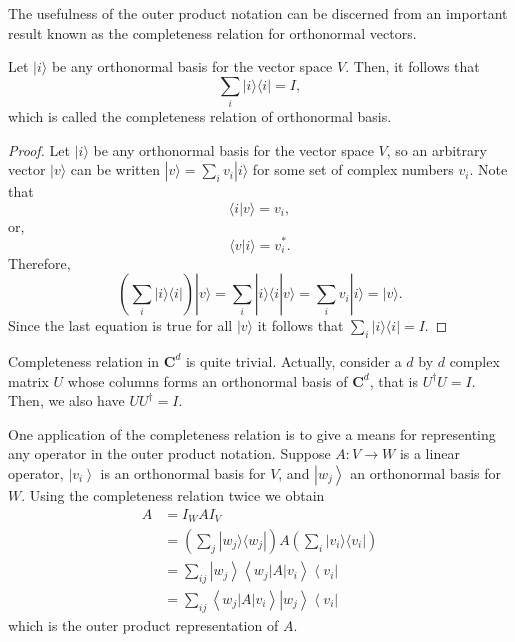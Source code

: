 \documentclass[
	11pt, %
	fleqn, %
	a4paper, %
]{LegrandOrangeBook}
\begin{document}
The usefulness of the outer product notation can be discerned from an important result known as the completeness relation for orthonormal vectors. 

\begin{theorem}
    Let $|i\rangle$ be any orthonormal basis for the vector space $V$. Then, it follows that
$$
\sum_{i}|i\rangle\langle i|=I,
$$
which is called the completeness relation of orthonormal basis.
\end{theorem}
    
\begin{proof}
    Let $|i\rangle$ be any orthonormal basis for the vector space $V$, so an arbitrary vector $|v\rangle$ can be written $|v\rangle=\sum_{i} v_{i}|i\rangle$ for some set of complex numbers $v_{i}$. Note that
$$
\langle i | v\rangle=v_{i},
$$
or,
$$
\langle v | i\rangle=v_{i}^{*}.
$$
Therefore,
$$
\left(\sum_{i}|i\rangle\langle i|\right)|v\rangle=\sum_{i}|i\rangle\langle i | v\rangle=\sum_{i} v_{i}|i\rangle=|v\rangle.
$$
Since the last equation is true for all $|v\rangle$ it follows that $\sum_{i}|i\rangle\langle i|=I.$
\end{proof}
\begin{remark}
    Completeness relation in $\mathbf{C}^{d}$ is quite trivial. Actually, consider a $d$ by $d$ complex matrix $U$ whose columns forms an orthonormal basis of $\mathbf{C}^{d}$, that is $U^{\dagger}U= I.$ Then, we also have $UU^{\dagger}= I.$
\end{remark}

One application of the completeness relation is to give a means for representing any operator in the outer product notation.
Suppose $A: V \rightarrow W$ is a linear operator, $\left|v_{i}\right\rangle$ is an orthonormal basis for $V$, and $\left|w_{j}\right\rangle$ an orthonormal basis for $W$. Using the completeness relation twice we obtain
$$
\begin{aligned}
A & =I_{W} A I_{V} \\
& = \left(\sum_{j}|w_{j}\rangle\langle w_{j}|\right) A  \left(\sum_{i}|v_{i}\rangle\langle v_{i}|\right)\\
& =\sum_{i j}\left|w_{j}\right\rangle\left\langle w_{j}|A| v_{i}\right\rangle\left\langle v_{i}\right| \\
& =\sum_{i j}\left\langle w_{j}|A| v_{i}\right\rangle\left|w_{j}\right\rangle\left\langle v_{i}\right|
\end{aligned}
$$
which is the outer product representation of $A$. 
\end{document}

